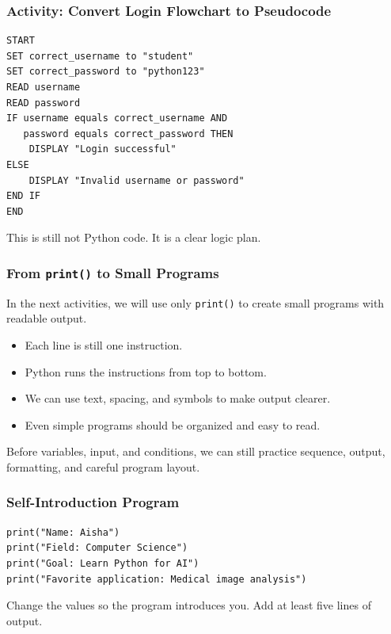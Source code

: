 \documentclass[aspectratio=169,10pt]{beamer}
\begin{document}
\begin{frame}[fragile]
\frametitle{Activity: Convert Login Flowchart to Pseudocode}
\vspace{0.40cm}
\begin{lstlisting}[style=pseudo,basicstyle=\ttfamily\small]
START
SET correct_username to "student"
SET correct_password to "python123"
READ username
READ password
IF username equals correct_username AND
   password equals correct_password THEN
    DISPLAY "Login successful"
ELSE
    DISPLAY "Invalid username or password"
END IF
END
\end{lstlisting}
\vspace{0.14cm}
\begin{tcolorbox}[lecturebox,title=Note]
This is still not Python code. It is a clear logic plan.
\end{tcolorbox}
\end{frame}


\begin{frame}[fragile]
\frametitle{From \texttt{print()} to Small Programs}
\vspace{0.55cm}
In the next activities, we will use only \texttt{print()} to create small programs with readable output.
\vspace{0.25cm}
\begin{itemize}
  \item Each line is still one instruction.
  \item Python runs the instructions from top to bottom.
  \item We can use text, spacing, and symbols to make output clearer.
  \item Even simple programs should be organized and easy to read.
\end{itemize}
\vspace{0.42cm}
\begin{tcolorbox}[lecturebox,title=Beginner focus]
Before variables, input, and conditions, we can still practice sequence, output, formatting, and careful program layout.
\end{tcolorbox}
\end{frame}


\begin{frame}[fragile]
\frametitle{Self-Introduction Program}
\vspace{1.45cm}
\begin{lstlisting}[style=pycodelarge]
print("Name: Aisha")
print("Field: Computer Science")
print("Goal: Learn Python for AI")
print("Favorite application: Medical image analysis")
\end{lstlisting}
\vspace{0.42cm}
\begin{tcolorbox}[lecturebox,title=Exercise variation]
Change the values so the program introduces you. Add at least five lines of output.
\end{tcolorbox}
\end{frame}
\end{document}
